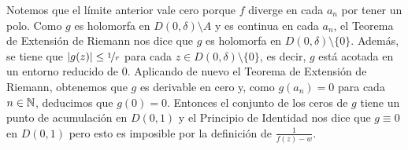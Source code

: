 \documentclass[12pt]{article}
\begin{document}
\begin{ejercicio}[2.5 puntos]
\begin{enumerate}
            Notemos que el límite anterior vale cero porque $f$ diverge en cada $a_n$ por tener un polo. Como $g$ es holomorfa en $D(0, \delta) \setminus A$ y es continua en cada $a_n$, el Teorema de Extensión de Riemann nos dice que $g$ es holomorfa en $D(0, \delta)\setminus \{0\}$. Además, se tiene que $|g(z)| \leq \nicefrac{1}{r}$ para cada $z \in D(0, \delta)\setminus \{0\}$, es decir, $g$ está acotada en un entorno reducido de $0$. Aplicando de nuevo el Teorema de Extensión de Riemann, obtenemos que $g$ es derivable en cero y, como $g(a_n) = 0$ para cada $n \in \mathbb{N}$, deducimos que $g(0) = 0$. Entonces el conjunto de los ceros de $g$ tiene un punto de acumulación en $D(0, 1)$ y el Principio de Identidad nos dice que $g \equiv 0$ en $D(0, 1)$ pero esto es imposible por la definición de $\frac{1}{f(z) - w}$.
        \end{enumerate}
    \end{ejercicio}
\end{document}

